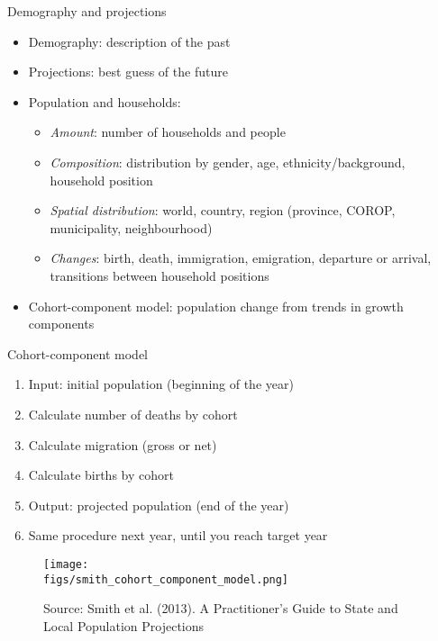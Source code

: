 \documentclass[final, 12pt, aspectratio=169, xcolor={dvipsnames}]{beamer}
\newcommand*{\figs}{../figs}%
\newcommand{\source}[1]{\caption*{\tiny Source: {#1}} }
\begin{document}
\begin{frame}{Demography and projections}
  \begin{itemize}
  \item Demography: description of the past 
  \item Projections: best guess of the future
  \item Population and households:
    \begin{itemize}
    \item \textit{Amount}: number of households and people 
    \item \textit{Composition}: distribution by gender, age, ethnicity/background, household position 
    \item \textit{Spatial distribution}: world, country, region (province, COROP, municipality, neighbourhood)
      \item \textit{Changes}: birth, death, immigration, emigration, departure or arrival, transitions between household positions
    \end{itemize}
    \item Cohort-component model: population change from trends in growth components
  \end{itemize}
\end{frame}

\begin{frame}{Cohort-component model}
  \begin{minipage}[t]{0.48\linewidth}%
    \begin{enumerate}
    \item Input: initial population (beginning of the year)
    \item Calculate number of deaths by cohort
    \item Calculate migration (gross or net)
    \item Calculate births by cohort
    \item Output: projected population (end of the year)
      \item Same procedure next year, until you reach target year
    \end{enumerate}   
\end{minipage}%
\hfill%
\begin{minipage}[t]{0.48\linewidth}
  \begin{figure}
    \texttt{[image: \\figs/smith\_cohort\_component\_model.png]}
    \source{Smith et al. (2013). A Practitioner's Guide to State and Local Population Projections}
  \end{figure}
\end{minipage}%
\end{frame}
\end{document}
